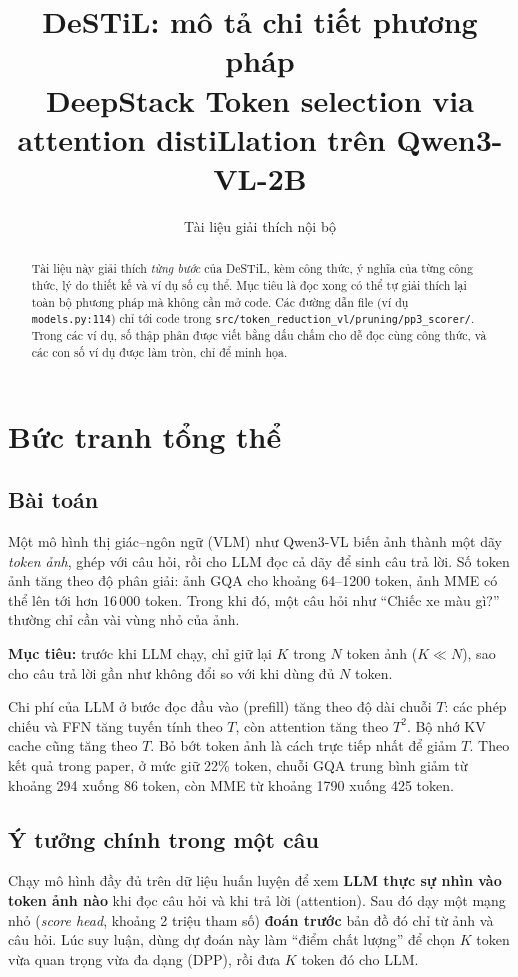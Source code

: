\documentclass[11pt,a4paper]{article}
\title{\textbf{DeSTiL}: mô tả chi tiết phương pháp\\[2pt]
\large DeepStack Token selection via attention distiLlation trên Qwen3-VL-2B}
\author{Tài liệu giải thích nội bộ}
\date{}
\newcommand{\file}[1]{\texttt{\small #1}}
\begin{document}
\maketitle

\begin{abstract}
Tài liệu này giải thích \emph{từng bước} của DeSTiL, kèm công thức, ý nghĩa của từng công thức, lý do thiết kế và ví dụ số cụ thể. Mục tiêu là đọc xong có thể tự giải thích lại toàn bộ phương pháp mà không cần mở code. Các đường dẫn file (ví dụ \file{models.py:114}) chỉ tới code trong \file{src/token\_reduction\_vl/pruning/pp3\_scorer/}. Trong các ví dụ, số thập phân được viết bằng dấu chấm cho dễ đọc cùng công thức, và các con số ví dụ được làm tròn, chỉ để minh họa.
\end{abstract}

\tableofcontents
\newpage

\section{Bức tranh tổng thể}

\subsection{Bài toán}
Một mô hình thị giác--ngôn ngữ (VLM) như Qwen3-VL biến ảnh thành một dãy \emph{token ảnh}, ghép với câu hỏi, rồi cho LLM đọc cả dãy để sinh câu trả lời. Số token ảnh tăng theo độ phân giải: ảnh GQA cho khoảng 64--1200 token, ảnh MME có thể lên tới hơn 16\,000 token. Trong khi đó, một câu hỏi như ``Chiếc xe màu gì?'' thường chỉ cần vài vùng nhỏ của ảnh.

\textbf{Mục tiêu:} trước khi LLM chạy, chỉ giữ lại $K$ trong $N$ token ảnh ($K\ll N$), sao cho câu trả lời gần như không đổi so với khi dùng đủ $N$ token.

\begin{trucgiac}
Chi phí của LLM ở bước đọc đầu vào (prefill) tăng theo độ dài chuỗi $T$: các phép chiếu và FFN tăng tuyến tính theo $T$, còn attention tăng theo $T^2$. Bộ nhớ KV cache cũng tăng theo $T$. Bỏ bớt token ảnh là cách trực tiếp nhất để giảm $T$. Theo kết quả trong paper, ở mức giữ 22\% token, chuỗi GQA trung bình giảm từ khoảng 294 xuống 86 token, còn MME từ khoảng 1790 xuống 425 token.
\end{trucgiac}

\subsection{Ý tưởng chính trong một câu}
\begin{tcolorbox}[colback=yellow!8,colframe=yellow!50!black]
Chạy mô hình đầy đủ trên dữ liệu huấn luyện để xem \textbf{LLM thực sự nhìn vào token ảnh nào} khi đọc câu hỏi và khi trả lời (attention). Sau đó dạy một mạng nhỏ (\emph{score head}, khoảng 2 triệu tham số) \textbf{đoán trước} bản đồ đó chỉ từ ảnh và câu hỏi. Lúc suy luận, dùng dự đoán này làm ``điểm chất lượng'' để chọn $K$ token vừa quan trọng vừa đa dạng (DPP), rồi đưa $K$ token đó cho LLM.
\end{tcolorbox}
\end{document}
